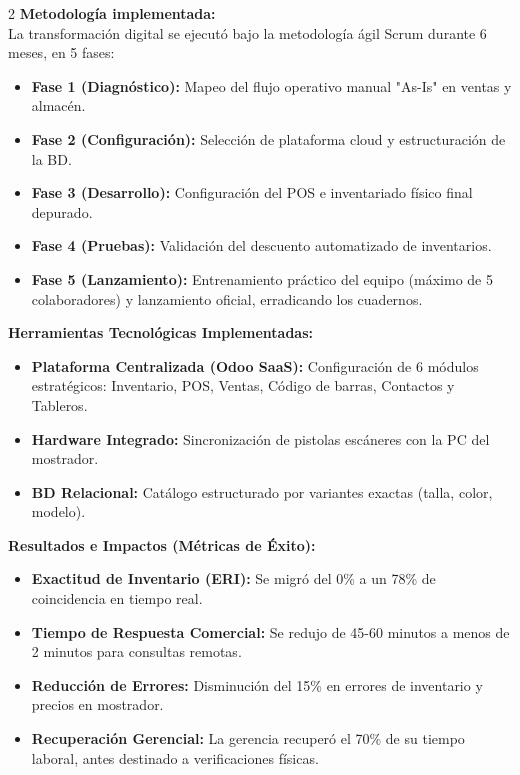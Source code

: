 \documentclass[12pt]{article}
\begin{document}
\begin{multicols}{2}
\textbf{Metodología implementada:}\\
La transformación digital se ejecutó bajo la metodología ágil Scrum durante 6 meses, en 5 fases:
\begin{itemize}
    \item \textbf{Fase 1 (Diagnóstico):} Mapeo del flujo operativo manual "As-Is" en ventas y almacén.
    \item \textbf{Fase 2 (Configuración):} Selección de plataforma cloud y estructuración de la BD.
    \item \textbf{Fase 3 (Desarrollo):} Configuración del POS e inventariado físico final depurado.
    \item \textbf{Fase 4 (Pruebas):} Validación del descuento automatizado de inventarios.
    \item \textbf{Fase 5 (Lanzamiento):} Entrenamiento práctico del equipo (máximo de 5 colaboradores) y lanzamiento oficial, erradicando los cuadernos.
\end{itemize}

\textbf{Herramientas Tecnológicas Implementadas:}\\
\begin{itemize}
    \item \textbf{Plataforma Centralizada (Odoo SaaS):} Configuración de 6 módulos estratégicos: Inventario, POS, Ventas, Código de barras, Contactos y Tableros.
    \item \textbf{Hardware Integrado:} Sincronización de pistolas escáneres con la PC del mostrador.
    \item \textbf{BD Relacional:} Catálogo estructurado por variantes exactas (talla, color, modelo).
\end{itemize}

\textbf{Resultados e Impactos (Métricas de Éxito):}\\
\begin{itemize}
    \item \textbf{Exactitud de Inventario (ERI):} Se migró del 0\% a un 78\% de coincidencia en tiempo real.
    \item \textbf{Tiempo de Respuesta Comercial:} Se redujo de 45-60 minutos a menos de 2 minutos para consultas remotas.
    \item \textbf{Reducción de Errores:} Disminución del 15\% en errores de inventario y precios en mostrador.
    \item \textbf{Recuperación Gerencial:} La gerencia recuperó el 70\% de su tiempo laboral, antes destinado a verificaciones físicas.
\end{itemize}


\end{multicols}
\end{document}
